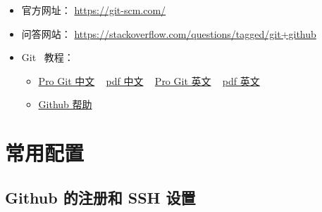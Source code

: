 \documentclass[
    11pt,
    cite=authoryear,
    device=normal,
    lang=cn,
    mode=simple,
    result=answer,
    toc=onecol,
]{elegantbook_sierxue}
\begin{document}
\begin{itemize}
    \item 官方网址： \href{https://git-scm.com/}{https://git-scm.com/}
    \item 问答网站：
        \href{https://stackoverflow.com/questions/tagged/git+github}
        {https://stackoverflow.com/questions/tagged/git+github}
    \item Git~ 教程：
        \begin{itemize}
            \item \href{https://git-scm.com/book/zh/v2}
                {Pro Git 中文}
                ~ \href{books/progit_v2.1.31_zh.pdf}{pdf 中文}
                ~ \href{https://git-scm.com/book/en/v2} {Pro Git 英文}
                 ~ \href{books/progit_v2.1.177_en.pdf}{pdf 英文}
            \item \href{https://help.github.com/en/github}
                {Github 帮助}
        \end{itemize}
\end{itemize}

\newpage
\section{常用配置}%
\label{sec:git-settings}

\subsection{Github 的注册和 SSH 设置}%
\label{sub:git-ssh}
\end{document}
